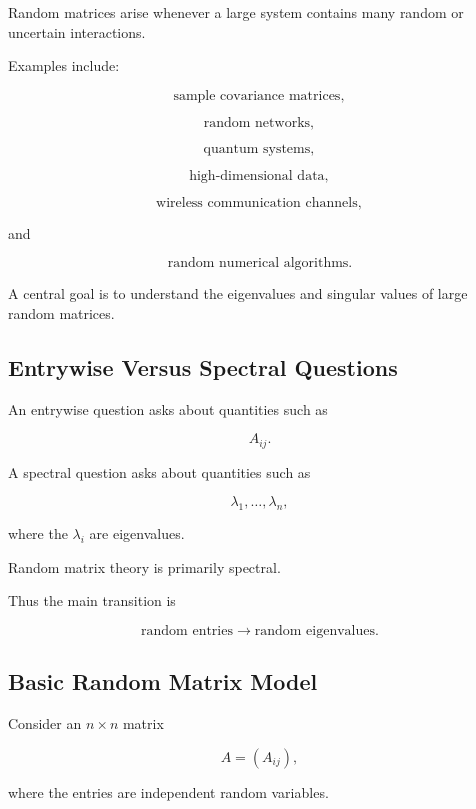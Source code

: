 Random matrices arise whenever a large system contains many random or
uncertain interactions.

Examples include:

\[
\boxed{
\text{sample covariance matrices},
}
\]

\[
\boxed{
\text{random networks},
}
\]

\[
\boxed{
\text{quantum systems},
}
\]

\[
\boxed{
\text{high-dimensional data},
}
\]

\[
\boxed{
\text{wireless communication channels},
}
\]

and

\[
\boxed{
\text{random numerical algorithms}.
}
\]

A central goal is to understand the eigenvalues and singular values of
large random matrices.

\subsection{Entrywise Versus Spectral Questions}
\label{subsec:entrywise-versus-spectral}

An entrywise question asks about quantities such as

\[
A_{ij}.
\]

A spectral question asks about quantities such as

\[
\lambda_1,\ldots,\lambda_n,
\]

where the \(\lambda_i\) are eigenvalues.

Random matrix theory is primarily spectral.

Thus the main transition is

\[
\boxed{
\text{random entries}
\longrightarrow
\text{random eigenvalues}.
}
\]

\subsection{Basic Random Matrix Model}
\label{subsec:basic-random-matrix-model}

Consider an \(n\times n\) matrix

\[
A
=
(A_{ij}),
\]

where the entries are independent random variables.

